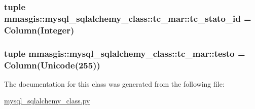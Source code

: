 \label{classmmasgis_1_1mysql__sqlalchemy__class_1_1tc__mar_ae2a77eb754df3096723bbe75c3b594bb}
\hypertarget{classmmasgis_1_1mysql__sqlalchemy__class_1_1tc__mar_a693976de850cf83b03e7d3d49de0ffd4}{
\subsubsection[{tc\_\-stato\_\-id}]{\setlength{\rightskip}{0pt plus 5cm}tuple {\bf mmasgis::mysql\_\-sqlalchemy\_\-class::tc\_\-mar::tc\_\-stato\_\-id} = Column(Integer)}}
\label{classmmasgis_1_1mysql__sqlalchemy__class_1_1tc__mar_a693976de850cf83b03e7d3d49de0ffd4}
\hypertarget{classmmasgis_1_1mysql__sqlalchemy__class_1_1tc__mar_a819857ac2fc684cccd14b89c25f23e55}{
\subsubsection[{testo}]{\setlength{\rightskip}{0pt plus 5cm}tuple {\bf mmasgis::mysql\_\-sqlalchemy\_\-class::tc\_\-mar::testo} = Column(Unicode(255))}}
\label{classmmasgis_1_1mysql__sqlalchemy__class_1_1tc__mar_a819857ac2fc684cccd14b89c25f23e55}


The documentation for this class was generated from the following file:\begin{DoxyCompactItemize}
\item 
\hyperlink{mysql__sqlalchemy__class_8py}{mysql\_\-sqlalchemy\_\-class.py}\end{DoxyCompactItemize}
